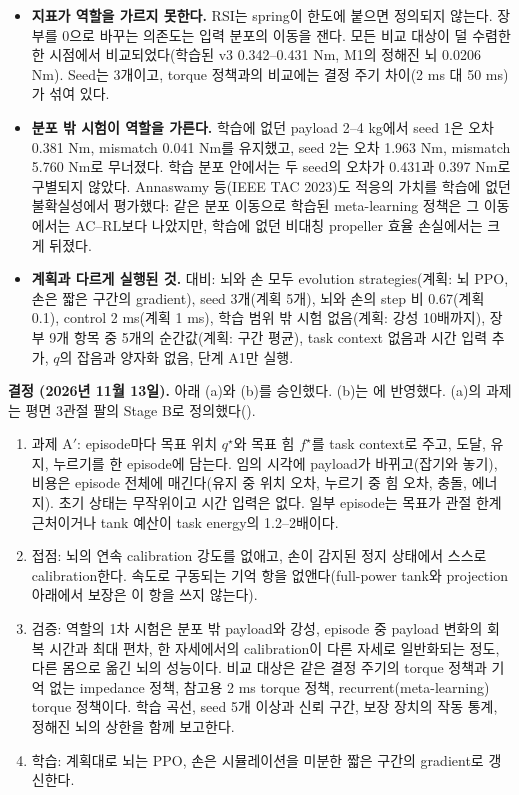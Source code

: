 \documentclass[11pt]{article}\usepackage[margin=1in]{geometry}\usepackage{amsmath,amssymb,amsthm,mathtools}\usepackage{graphicx}\graphicspath{{figures/}{../figures/}{figs/}{./}}\usepackage{enumitem}\usepackage{hyperref}\usepackage{cleveref}\usepackage{tikz}\usetikzlibrary{arrows.meta,positioning,calc,shapes.geometric}\usepackage{float}\usepackage{rotating}\usepackage[most]{tcolorbox}\usepackage{kotex}\usepackage{booktabs}\usepackage{longtable}\emergencystretch=1.6em\tolerance=2000 \crefname{assumption}{Assumption}{Assumptions}\Crefname{assumption}{Assumption}{Assumptions}\crefname{definition}{Definition}{Definitions}\Crefname{definition}{Definition}{Definitions}\crefname{proposition}{Proposition}{Propositions}\Crefname{proposition}{Proposition}{Propositions}\crefname{fact}{Fact}{Facts}\Crefname{fact}{Fact}{Facts} \newtheorem{assumption}{Assumption}\newtheorem{definition}{Definition}\newtheorem{lemma}{Lemma}\newtheorem{proposition}{Proposition}\newtheorem{theorem}{Theorem}\newtheorem{corollary}{Corollary}\newtheorem{fact}{Fact}\theoremstyle{remark}\newtheorem{remark}{Remark} \newcommand{\R}{\mathbb{R}}\newcommand{\xb}{\bar x}\newcommand{\Ab}{\bar A}\newcommand{\By}{\bar B_y}\newcommand{\U}{\mathcal U}\newcommand{\Z}{\mathcal Z}
\begin{document}
\begin{itemize}
\item \textbf{지표가 역할을 가르지 못한다.} RSI는 spring이 한도에 붙으면 정의되지 않는다. 장부를 0으로 바꾸는 의존도는 입력 분포의 이동을 잰다. 모든 비교 대상이 덜 수렴한 한 시점에서 비교되었다(학습된 v3 0.342--0.431 Nm, M1의 정해진 뇌 0.0206 Nm). Seed는 3개이고, torque 정책과의 비교에는 결정 주기 차이(2 ms 대 50 ms)가 섞여 있다.
\item \textbf{분포 밖 시험이 역할을 가른다.} 학습에 없던 payload 2--4 kg에서 seed 1은 오차 0.381 Nm, mismatch 0.041 Nm를 유지했고, seed 2는 오차 1.963 Nm, mismatch 5.760 Nm로 무너졌다. 학습 분포 안에서는 두 seed의 오차가 0.431과 0.397 Nm로 구별되지 않았다. Annaswamy 등(IEEE TAC 2023)도 적응의 가치를 학습에 없던 불확실성에서 평가했다: 같은 분포 이동으로 학습된 meta-learning 정책은 그 이동에서는 AC--RL보다 나았지만, 학습에 없던 비대칭 propeller 효율 손실에서는 크게 뒤졌다.
\item \textbf{계획과 다르게 실행된 것.}  대비: 뇌와 손 모두 evolution strategies(계획: 뇌 PPO, 손은 짧은 구간의 gradient), seed 3개(계획 5개), 뇌와 손의 step 비 0.67(계획 0.1), control 2 ms(계획 1 ms), 학습 범위 밖 시험 없음(계획: 강성 10배까지), 장부 9개 항목 중 5개의 순간값(계획: 구간 평균), task context 없음과 시간 입력 추가, $q$의 잡음과 양자화 없음, 단계 A1만 실행.
\end{itemize}

\textbf{결정 (2026년 11월 13일).} 아래 (a)와 (b)를 승인했다. (b)는 에 반영했다. (a)의 과제는 평면 3관절 팔의 Stage B로 정의했다().
\begin{enumerate}[label=(\alph*)]
\item 과제 A$'$: episode마다 목표 위치 $q^\star$와 목표 힘 $f^\star$를 task context로 주고, 도달, 유지, 누르기를 한 episode에 담는다. 임의 시각에 payload가 바뀌고(잡기와 놓기), 비용은 episode 전체에 매긴다(유지 중 위치 오차, 누르기 중 힘 오차, 충돌, 에너지). 초기 상태는 무작위이고 시간 입력은 없다. 일부 episode는 목표가 관절 한계 근처이거나 tank 예산이 task energy의 1.2--2배이다.
\item 접점: 뇌의 연속 calibration 강도를 없애고, 손이 감지된 정지 상태에서 스스로 calibration한다. 속도로 구동되는 기억 항을 없앤다(full-power tank와 projection 아래에서 보장은 이 항을 쓰지 않는다).
\item 검증: 역할의 1차 시험은 분포 밖 payload와 강성, episode 중 payload 변화의 회복 시간과 최대 편차, 한 자세에서의 calibration이 다른 자세로 일반화되는 정도, 다른 몸으로 옮긴 뇌의 성능이다. 비교 대상은 같은 결정 주기의 torque 정책과 기억 없는 impedance 정책, 참고용 2 ms torque 정책, recurrent(meta-learning) torque 정책이다. 학습 곡선, seed 5개 이상과 신뢰 구간, 보장 장치의 작동 통계, 정해진 뇌의 상한을 함께 보고한다.
\item 학습: 계획대로 뇌는 PPO, 손은 시뮬레이션을 미분한 짧은 구간의 gradient로 갱신한다.
\end{enumerate}
\end{document}
